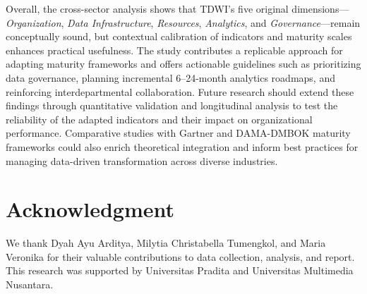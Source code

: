 \documentclass[conference]{IEEEtran}
\begin{document}
Overall, the cross-sector analysis shows that TDWI's five original dimensions—\textit{Organization}, \textit{Data Infrastructure}, \textit{Resources}, \textit{Analytics}, and \textit{Governance}—remain conceptually sound, but contextual calibration of indicators and maturity scales enhances practical usefulness. The study contributes a replicable approach for adapting maturity frameworks and offers actionable guidelines such as prioritizing data governance, planning incremental 6–24-month analytics roadmaps, and reinforcing interdepartmental collaboration. Future research should extend these findings through quantitative validation and longitudinal analysis to test the reliability of the adapted indicators and their impact on organizational performance. Comparative studies with Gartner and DAMA-DMBOK maturity frameworks could also enrich theoretical integration and inform best practices for managing data-driven transformation across diverse industries.


\section*{Acknowledgment}
We thank Dyah Ayu Arditya, Milytia Christabella Tumengkol, and Maria Veronika for their valuable contributions to data collection, analysis, and report. This research was supported by Universitas Pradita and Universitas Multimedia Nusantara.




\end{document}

